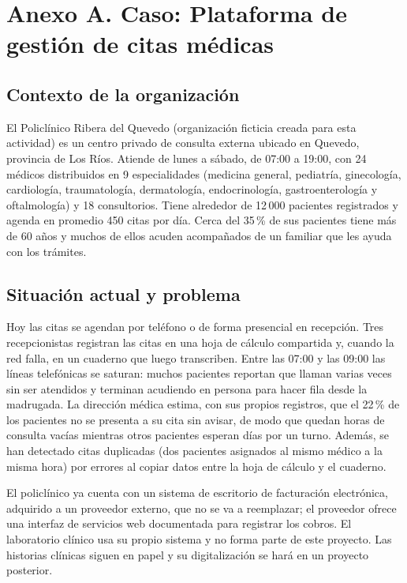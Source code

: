 \documentclass[11pt]{article}
\newcommand{\seccion}[1]{\section{\textcolor{utegreendk}{#1}}}
\newcommand{\subseccion}[1]{\subsection{\textcolor{midblue}{#1}}}
\begin{document}
\clearpage
\seccion{Anexo A. Caso: Plataforma de gestión de citas médicas}
\label{sec:caso}

\subseccion{Contexto de la organización}
El Policlínico Ribera del Quevedo (organización ficticia creada para esta actividad) es un centro privado de consulta externa ubicado en Quevedo, provincia de Los Ríos. Atiende de lunes a sábado, de 07:00 a 19:00, con 24 médicos distribuidos en 9 especialidades (medicina general, pediatría, ginecología, cardiología, traumatología, dermatología, endocrinología, gastroenterología y oftalmología) y 18 consultorios. Tiene alrededor de 12\,000 pacientes registrados y agenda en promedio 450 citas por día. Cerca del 35\,\% de sus pacientes tiene más de 60 años y muchos de ellos acuden acompañados de un familiar que les ayuda con los trámites.

\subseccion{Situación actual y problema}
Hoy las citas se agendan por teléfono o de forma presencial en recepción. Tres recepcionistas registran las citas en una hoja de cálculo compartida y, cuando la red falla, en un cuaderno que luego transcriben. Entre las 07:00 y las 09:00 las líneas telefónicas se saturan: muchos pacientes reportan que llaman varias veces sin ser atendidos y terminan acudiendo en persona para hacer fila desde la madrugada. La dirección médica estima, con sus propios registros, que el 22\,\% de los pacientes no se presenta a su cita sin avisar, de modo que quedan horas de consulta vacías mientras otros pacientes esperan días por un turno. Además, se han detectado citas duplicadas (dos pacientes asignados al mismo médico a la misma hora) por errores al copiar datos entre la hoja de cálculo y el cuaderno.

El policlínico ya cuenta con un sistema de escritorio de facturación electrónica, adquirido a un proveedor externo, que no se va a reemplazar; el proveedor ofrece una interfaz de servicios web documentada para registrar los cobros. El laboratorio clínico usa su propio sistema y no forma parte de este proyecto. Las historias clínicas siguen en papel y su digitalización se hará en un proyecto posterior.
\end{document}
